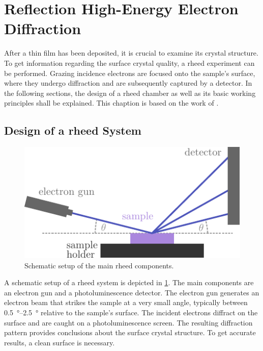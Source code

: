 \section{Reflection High-Energy Electron Diffraction}
After a thin film has been deposited, it is crucial to examine its crystal structure. 
To get information regarding the surface crystal quality, a \ac{rheed} experiment 
can be performed. 
Grazing incidence electrons are focused onto the sample's surface, where they undergo 
diffraction and are subsequently captured by a detector.
In the following sections, the design of a \ac{rheed} chamber as well as
its basic working principles shall be explained.
This chaption is based on the work of \cite{rheed}.

\subsection{Design of a \ac{rheed} System}

\begin{figure}
    \includegraphics{../assets/rheed.pdf}
    \caption{Schematic setup of the main \ac{rheed} components. }
	\label{fig:rheed_1}
\end{figure}

A schematic setup of a \ac{rheed} system is depicted in \cref{fig:rheed_1}.
The main components are an electron gun and a photoluminescence detector. 
The electron gun generates an electron beam that strikes the sample at a very small 
angle, typically between \qtyrange{0.5}{2.5}{\degree} relative to the sample's surface. 
The incident electrons diffract on the surface and are caught on a photoluminescence 
screen. 
The resulting diffraction pattern provides conclusions about the surface crystal 
structure. 
To get accurate results, a clean surface is necessary.

